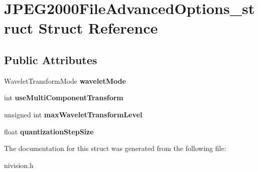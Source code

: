 \hypertarget{structJPEG2000FileAdvancedOptions__struct}{
\section{JPEG2000FileAdvancedOptions\_\-struct Struct Reference}
\label{structJPEG2000FileAdvancedOptions__struct}
}
\subsection*{Public Attributes}
\begin{DoxyCompactItemize}
\item 
\hypertarget{structJPEG2000FileAdvancedOptions__struct_a26787312431d4d8a9ccb310f35c3cdc5}{
WaveletTransformMode {\bfseries waveletMode}}
\label{structJPEG2000FileAdvancedOptions__struct_a26787312431d4d8a9ccb310f35c3cdc5}

\item 
\hypertarget{structJPEG2000FileAdvancedOptions__struct_aee18ba31f6a97bee18cc1537577c0af0}{
int {\bfseries useMultiComponentTransform}}
\label{structJPEG2000FileAdvancedOptions__struct_aee18ba31f6a97bee18cc1537577c0af0}

\item 
\hypertarget{structJPEG2000FileAdvancedOptions__struct_a4650461874a0c22bb5144f66a77dccbe}{
unsigned int {\bfseries maxWaveletTransformLevel}}
\label{structJPEG2000FileAdvancedOptions__struct_a4650461874a0c22bb5144f66a77dccbe}

\item 
\hypertarget{structJPEG2000FileAdvancedOptions__struct_a56f820232f42967cfa5c6205ff837a4d}{
float {\bfseries quantizationStepSize}}
\label{structJPEG2000FileAdvancedOptions__struct_a56f820232f42967cfa5c6205ff837a4d}

\end{DoxyCompactItemize}


The documentation for this struct was generated from the following file:\begin{DoxyCompactItemize}
\item 
nivision.h\end{DoxyCompactItemize}

